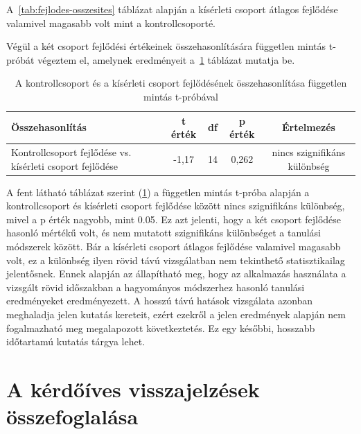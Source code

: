 A~\ref{tab:fejlodes-osszesites} táblázat alapján a kísérleti csoport átlagos fejlődése valamivel magasabb volt mint a kontrollcsoporté. 

Végül a két csoport fejlődési értékeinek összehasonlítására független mintás t-próbát végeztem el, amelynek eredményeit a~\ref{tab:fejlodes-fuggetlen-tproba} táblázat mutatja be.


\begin{table}[h!]
\centering
\begin{tabular}{p{6cm}cccc}
\hline
\textbf{Összehasonlítás} & \textbf{t érték} & \textbf{df} & \textbf{p érték} & \textbf{Értelmezés} \\
\hline
Kontrollcsoport fejlődése vs. kísérleti csoport fejlődése & -1,17 & 14 & 0,262 & nincs szignifikáns különbség \\
\hline
\end{tabular}
\caption{A kontrollcsoport és a kísérleti csoport fejlődésének összehasonlítása független mintás t-próbával}
\label{tab:fejlodes-fuggetlen-tproba}
\end{table}

A fent látható táblázat szerint (\ref{tab:fejlodes-fuggetlen-tproba}) a független mintás t-próba alapján a kontrollcsoport és kísérleti csoport fejlődése között nincs szignifikáns különbség, mivel a p érték nagyobb, mint 0.05. Ez azt jelenti, hogy a két csoport fejlődése hasonló mértékű volt, és nem mutatott szignifikáns különbséget a tanulási módszerek között. Bár a kísérleti csoport átlagos fejlődése valamivel magasabb volt, ez a különbség ilyen rövid távú vizsgálatban nem tekinthető statisztikailag jelentősnek. Ennek alapján az állapítható meg, hogy az alkalmazás használata a vizsgált rövid időszakban a hagyományos módszerhez hasonló tanulási eredményeket eredményezett. A hosszú távú hatások vizsgálata azonban meghaladja jelen kutatás kereteit, ezért ezekről a jelen eredmények alapján nem fogalmazható meg megalapozott következtetés. Ez egy későbbi, hosszabb időtartamú kutatás tárgya lehet.
\newpage

\section{A kérdőíves visszajelzések összefoglalása}

